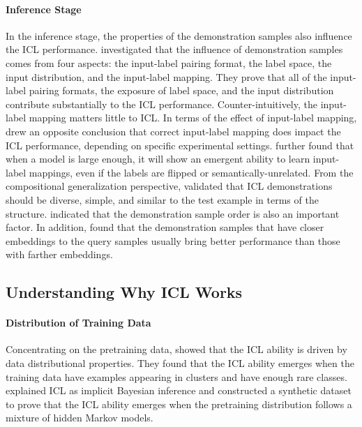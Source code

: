\paragraph{Inference Stage}
In the inference stage, the properties of the demonstration samples also influence the ICL performance. 
\citet{min2022rethinking} investigated that the influence of demonstration samples comes from four aspects: the input-label pairing format, the label space, the input distribution, and the input-label mapping. 
They prove that all of the input-label pairing formats, the exposure of label space, and the input distribution contribute substantially to the ICL performance. Counter-intuitively, the input-label mapping matters little to ICL. 
In terms of the effect of input-label mapping, \citet{ground_truth} drew an opposite conclusion that correct input-label mapping does impact the ICL performance, depending on specific experimental settings.
\citet{llm_icl_differently} further found that when a model is large enough, it will show an emergent ability to learn input-label mappings, even if the labels are flipped or semantically-unrelated. 
From the compositional generalization perspective, \citet{compositional_generalization} validated that ICL demonstrations should be diverse, simple, and similar to the test example in terms of the structure. 
\citet{lu2022order} indicated that the demonstration sample order is also an important factor.
In addition, \citet{liu2022close} found that the demonstration samples that have closer embeddings to the query samples usually bring better performance than those with farther embeddings. 



\subsection{Understanding Why ICL Works}

\paragraph{Distribution of Training Data} 
Concentrating on the pretraining data, \citet{distribution} showed that the ICL ability is driven by data distributional properties. 
They found that the ICL ability emerges when the training data have examples appearing in clusters and have enough rare classes. 
\citet{bayesian} explained ICL as implicit Bayesian inference and constructed a synthetic dataset to prove that the ICL ability emerges when the pretraining distribution follows a mixture of hidden Markov models. 

